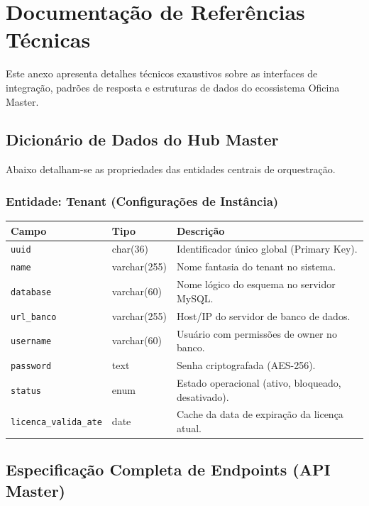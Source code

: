 \chapter{Documentação de Referências Técnicas}
\label{anexo:a}

Este anexo apresenta detalhes técnicos exaustivos sobre as interfaces de integração, padrões de resposta e estruturas de dados do ecossistema Oficina Master.

\section{Dicionário de Dados do Hub Master}

Abaixo detalham-se as propriedades das entidades centrais de orquestração.

\subsection{Entidade: Tenant (Configurações de Instância)}
\begin{longtable}{lll}
    \toprule
    \textbf{Campo} & \textbf{Tipo} & \textbf{Descrição} \\
    \midrule
    \texttt{uuid} & char(36) & Identificador único global (Primary Key). \\
    \texttt{name} & varchar(255) & Nome fantasia do tenant no sistema. \\
    \texttt{database} & varchar(60) & Nome lógico do esquema no servidor MySQL. \\
    \texttt{url\_banco} & varchar(255) & Host/IP do servidor de banco de dados. \\
    \texttt{username} & varchar(60) & Usuário com permissões de owner no banco. \\
    \texttt{password} & text & Senha criptografada (AES-256). \\
    \texttt{status} & enum & Estado operacional (ativo, bloqueado, desativado). \\
    \texttt{licenca\_valida\_ate} & date & Cache da data de expiração da licença atual. \\
    \bottomrule
\end{longtable}

\section{Especificação Completa de Endpoints (API Master)}

